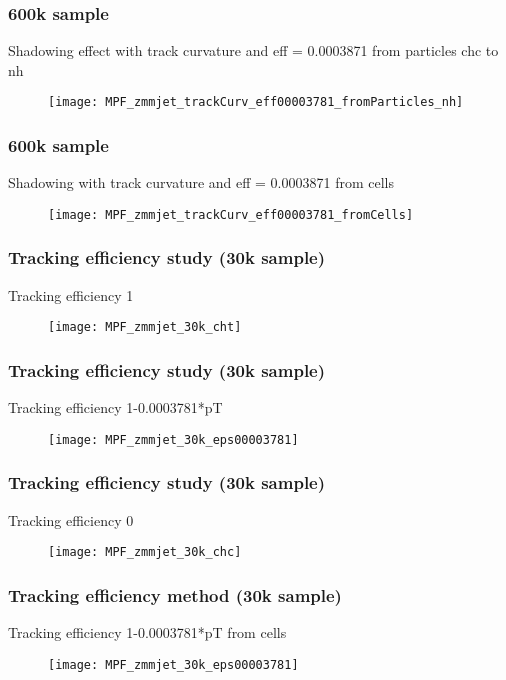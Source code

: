 \documentclass{beamer}
\begin{document}
\begin{frame}
\frametitle{600k sample}
Shadowing effect with track curvature and eff = 0.0003871 from particles chc to nh
\begin{figure}[H]
\texttt{[image: MPF\_zmmjet\_trackCurv\_eff00003781\_fromParticles\_nh]}
\centering
\end{figure}
\end{frame}

\begin{frame}
\frametitle{600k sample}
Shadowing with track curvature and eff = 0.0003871 from cells
\vspace{\baselineskip}
\begin{figure}[H]
\texttt{[image: MPF\_zmmjet\_trackCurv\_eff00003781\_fromCells]}
\centering
\end{figure}
\end{frame}


\begin{frame}
\frametitle{Tracking efficiency study (30k sample)}
Tracking efficiency 1
\begin{figure}[H]
\texttt{[image: MPF\_zmmjet\_30k\_cht]}
\centering
\end{figure}
\end{frame}

\begin{frame}
\frametitle{Tracking efficiency study (30k sample)}
Tracking efficiency 1-0.0003781*pT
\begin{figure}[H]
\texttt{[image: MPF\_zmmjet\_30k\_eps00003781]}
\centering
\end{figure}
\end{frame}

\begin{frame}
\frametitle{Tracking efficiency study (30k sample)}
Tracking efficiency 0
\begin{figure}[H]
\texttt{[image: MPF\_zmmjet\_30k\_chc]}
\centering
\end{figure}
\end{frame}


\begin{frame}
\frametitle{Tracking efficiency method (30k sample)}
Tracking efficiency 1-0.0003781*pT from cells
\begin{figure}[H]
\texttt{[image: MPF\_zmmjet\_30k\_eps00003781]}
\centering
\end{figure}
\end{frame}
\end{document}
